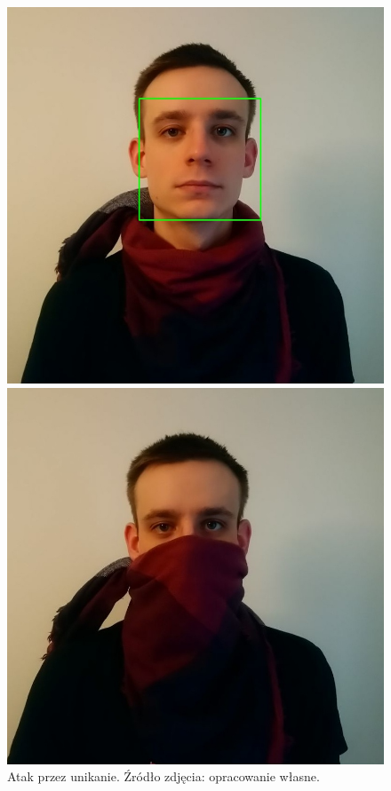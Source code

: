 \documentclass[12pt,a4paper,leqno,oneside,titlepage]{book}
\begin{document}
\begin{figure}[!tbp]
  \centering
  \begin{minipage}[b]{0.4\textwidth}
    \includegraphics[width=\textwidth]{pictures/Tomek_detected.jpg}
  \end{minipage}
  \hfill
  \begin{minipage}[b]{0.4\textwidth}
    \includegraphics[width=\textwidth]{pictures/Tomek_szalik_detected.jpg}
  \end{minipage}
  \caption{Atak przez unikanie. Źródło zdjęcia: opracowanie własne.}
\end{figure}
\end{document}
